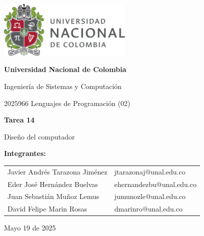\documentclass{article}
\begin{document}
\begin{titlepage}
  \centering
  \includegraphics[width=0.48\textwidth]{logo_universidad.png}
  \par\vspace{2cm}

  {\Large \textbf{Universidad Nacional de Colombia} \par}
  \vspace{0.5cm}
  {\large Ingeniería de Sistemas y Computación \par}
  {\large 2025966 Lenguajes de Programación (02)\par}
  \vspace{3cm}

  {\large \textbf{Tarea 14} \par}
  {\large Diseño del computador\par}
  \vspace{3cm}

  {\large \textbf{Integrantes:} \par}
  \vspace{0.5cm}
  \begin{tabular}{ll}
    Javier Andrés Tarazona Jiménez & jtarazonaj@unal.edu.co   \\
    Eder  José Hernández Buelvas   & ehernandezbu@unal.edu.co \\
    Juan Sebastián Muñoz Lemus     & jumunozle@unal.edu.co   \\
    David Felipe Marin Rosas       & dmarinro@unal.edu.co   \\

  \end{tabular}
  \par\vspace{3cm}

  {\large Mayo 19 de 2025 \par}
\end{titlepage}

\tableofcontents %

\newpage %
\end{document}
